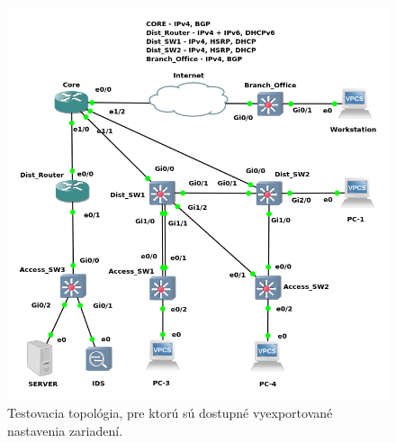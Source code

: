 \begin{figure}[H]
	\begin{center}
		\includegraphics[scale=0.6]{obrazky/gns_topologia.png}
	\end{center}
	\caption[Testovacia topológia, pre ktorú sú dostupné vyexportované nastavenia zariadení.]{Testovacia topológia, pre ktorú sú dostupné vyexportované nastavenia zariadení.}
	\label{gns_topology}
\end{figure}



